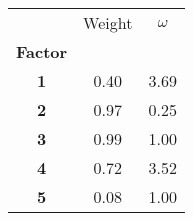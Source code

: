 \begin{tabular}{ccc}
    \toprule
    {}              & Weight & $\omega$ \\
    \textbf{Factor} &        &          \\
    \midrule
    \textbf{1     } & 0.40   & 3.69     \\
    \textbf{2     } & 0.97   & 0.25     \\
    \textbf{3     } & 0.99   & 1.00     \\
    \textbf{4     } & 0.72   & 3.52     \\
    \textbf{5     } & 0.08   & 1.00     \\
    \bottomrule
\end{tabular}
